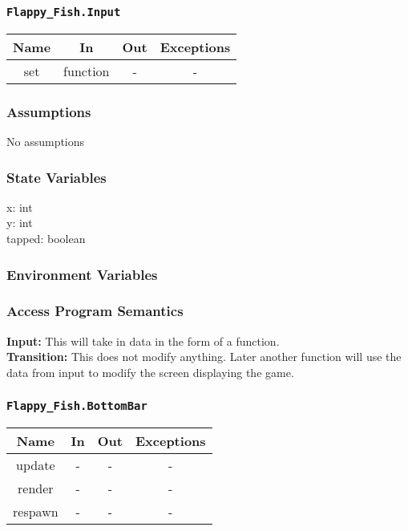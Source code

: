 \documentclass[11pt, oneside]{article}   	%
\begin{document}
\subsubsection{\texttt{Flappy\_Fish.Input}}



\begin{center}
\begin{tabular}{ |c|c|c|c| } 
 \hline
 Name & In & Out & Exceptions \\ 
 \hline \hline
 set & function & - & - \\ 
 \hline
\end{tabular}
\end{center}

\subsubsection{Assumptions}
No assumptions

\subsubsection{State Variables}
x: int\\
y: int\\
tapped: boolean
\subsubsection{Environment Variables}


\subsubsection{Access Program Semantics} 
 \textbf{Input:} This will take in data in the form of a function. \\
 \textbf{Transition:} This does not modify anything. Later another function will use the data from input to modify the screen displaying the game.



\subsubsection{\texttt{Flappy\_Fish.BottomBar}}



\begin{center}
\begin{tabular}{ |c|c|c|c| } 
 \hline
 Name & In & Out & Exceptions \\ 
 \hline \hline
 update & - & - & - \\ 
render & - & - & - \\ 
respawn & - & - & - \\ 
 \hline
\end{tabular}
\end{center}
\end{document}
